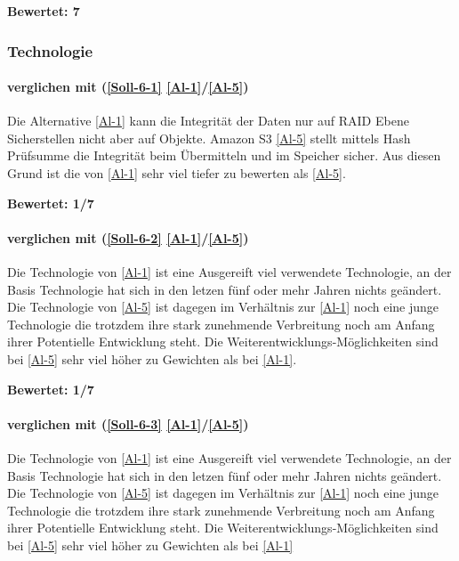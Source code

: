 \textbf{Bewertet: 7}


\subsubsection{Technologie}

\paragraph*{  verglichen mit  (\ref{Soll-6-1} \ref{Al-1}/\ref{Al-5})} 
Die Alternative \ref{Al-1} kann die Integrität der Daten nur auf RAID Ebene Sicherstellen nicht aber auf Objekte. Amazon S3 \ref{Al-5} stellt mittels Hash Prüfsumme die Integrität beim Übermitteln und im Speicher sicher. Aus diesen Grund ist die  von \ref{Al-1} sehr viel tiefer zu bewerten als \ref{Al-5}.

\textbf{Bewertet: 1/7}

\paragraph*{  verglichen mit  (\ref{Soll-6-2} \ref{Al-1}/\ref{Al-5})} 
Die Technologie von \ref{Al-1} ist eine Ausgereift viel verwendete Technologie, an der Basis Technologie hat sich in den letzen fünf oder mehr Jahren nichts geändert. Die Technologie von \ref{Al-5} ist dagegen im Verhältnis zur \ref{Al-1} noch eine junge Technologie die trotzdem ihre stark zunehmende Verbreitung noch am Anfang ihrer Potentielle Entwicklung steht. Die Weiterentwicklungs-Möglichkeiten sind bei \ref{Al-5} sehr viel höher zu Gewichten als bei \ref{Al-1}.

\textbf{Bewertet: 1/7}

\paragraph*{  verglichen mit  (\ref{Soll-6-3} \ref{Al-1}/\ref{Al-5})} 
Die Technologie von \ref{Al-1} ist eine Ausgereift viel verwendete Technologie, an der Basis Technologie hat sich in den letzen fünf oder mehr Jahren nichts geändert. Die Technologie von \ref{Al-5} ist dagegen im Verhältnis zur \ref{Al-1} noch eine junge Technologie die trotzdem ihre stark zunehmende Verbreitung noch am Anfang ihrer Potentielle Entwicklung steht. Die Weiterentwicklungs-Möglichkeiten sind bei \ref{Al-5} sehr viel höher zu Gewichten als bei \ref{Al-1}

